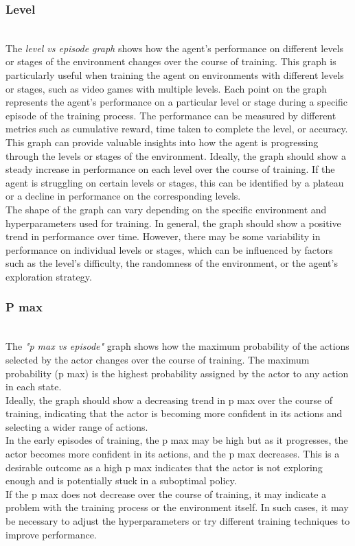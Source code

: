 \documentclass[preprint,12pt]{elsarticle}
\begin{document}
\subsubsection{Level}\\
The \textit{level vs episode graph} shows how the agent's performance on different levels or stages of the environment changes over the course of training. This graph is particularly useful when training the agent on environments with different levels or stages, such as video games with multiple levels. Each point on the graph represents the agent's performance on a particular level or stage during a specific episode of the training process. The performance can be measured by different metrics such as cumulative reward, time taken to complete the level, or accuracy.\\
This graph can provide valuable insights into how the agent is progressing through the levels or stages of the environment. Ideally, the graph should show a steady increase in performance on each level over the course of training. If the agent is struggling on certain levels or stages, this can be identified by a plateau or a decline in performance on the corresponding levels.\\
The shape of the graph can vary depending on the specific environment and hyperparameters used for training. In general, the graph should show a positive trend in performance over time. However, there may be some variability in performance on individual levels or stages, which can be influenced by factors such as the level's difficulty, the randomness of the environment, or the agent's exploration strategy.\\

\subsubsection{P max}\\
The \textit{"p max vs episode"} graph shows how the maximum probability of the actions selected by the actor changes over the course of training. The maximum probability (p max) is the highest probability assigned by the actor to any action in each state.\\
Ideally, the graph should show a decreasing trend in p max over the course of training, indicating that the actor is becoming more confident in its actions and selecting a wider range of actions.\\
In the early episodes of training, the p max may be high but as it progresses, the actor becomes more confident in its actions, and the p max decreases. This is a desirable outcome as a high p max indicates that the actor is not exploring enough and is potentially stuck in a suboptimal policy.\\
If the p max does not decrease over the course of training, it may indicate a problem with the training process or the environment itself. In such cases, it may be necessary to adjust the hyperparameters or try different training techniques to improve performance.\\
\end{document}
